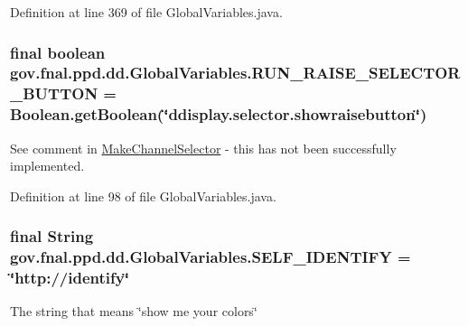 Definition at line 369 of file Global\-Variables.\-java.

\hypertarget{classgov_1_1fnal_1_1ppd_1_1dd_1_1GlobalVariables_ab3d08672e81ebb3ed3cea10a5fcaf914}{
\subsubsection[{R\-U\-N\-\_\-\-R\-A\-I\-S\-E\-\_\-\-S\-E\-L\-E\-C\-T\-O\-R\-\_\-\-B\-U\-T\-T\-O\-N}]{\setlength{\rightskip}{0pt plus 5cm}final boolean gov.\-fnal.\-ppd.\-dd.\-Global\-Variables.\-R\-U\-N\-\_\-\-R\-A\-I\-S\-E\-\_\-\-S\-E\-L\-E\-C\-T\-O\-R\-\_\-\-B\-U\-T\-T\-O\-N = Boolean.\-get\-Boolean(\char`\"{}ddisplay.\-selector.\-showraisebutton\char`\"{})\hspace{0.3cm}{\ttfamily [static]}}}\label{classgov_1_1fnal_1_1ppd_1_1dd_1_1GlobalVariables_ab3d08672e81ebb3ed3cea10a5fcaf914}
See comment in \hyperlink{classgov_1_1fnal_1_1ppd_1_1dd_1_1MakeChannelSelector}{Make\-Channel\-Selector} -\/ this has not been successfully implemented. 

Definition at line 98 of file Global\-Variables.\-java.

\hypertarget{classgov_1_1fnal_1_1ppd_1_1dd_1_1GlobalVariables_aaaf6fe49f89ce39ddba1fac773161acf}{
\subsubsection[{S\-E\-L\-F\-\_\-\-I\-D\-E\-N\-T\-I\-F\-Y}]{\setlength{\rightskip}{0pt plus 5cm}final String gov.\-fnal.\-ppd.\-dd.\-Global\-Variables.\-S\-E\-L\-F\-\_\-\-I\-D\-E\-N\-T\-I\-F\-Y = \char`\"{}http\-://identify\char`\"{}\hspace{0.3cm}{\ttfamily [static]}}}\label{classgov_1_1fnal_1_1ppd_1_1dd_1_1GlobalVariables_aaaf6fe49f89ce39ddba1fac773161acf}
The string that means \char`\"{}show me your colors\char`\"{} 

